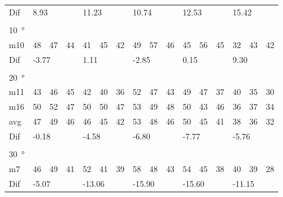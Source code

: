 \begin{table}[H]
\begin{tabular}{l|l|l|l|l|l|l|l|l|l|l|l|l|lll}
Dif & \multicolumn{3}{l|}{8.93} & \multicolumn{3}{l|}{11.23} & \multicolumn{3}{l|}{10.74} & \multicolumn{3}{l|}{12.53} & \multicolumn{3}{l}{15.42} \\ 
 \multicolumn{16}{l}{ } \\                             
\SI{10}{\degree}   & \multicolumn{3}{l|}{} & \multicolumn{3}{l|}{} & \multicolumn{3}{l|}{} & \multicolumn{3}{l|}{} & \multicolumn{3}{l}{}   \\  \hline
m10   &  48    &  47    &  44    & 41     &  45    &  42    & 49     &  57     &  46    &  45     &  56    &  45    & \multicolumn{1}{l|}{32} & \multicolumn{1}{l|}{43} & 42 \\ \hline
Dif & \multicolumn{3}{l|}{-3.77} & \multicolumn{3}{l|}{1.11} & \multicolumn{3}{l|}{-2.85} & \multicolumn{3}{l|}{0.15} & \multicolumn{3}{l}{9.30}  \\ 
 \multicolumn{16}{l}{ } \\                             
\SI{20}{\degree}   & \multicolumn{3}{l|}{} & \multicolumn{3}{l|}{} & \multicolumn{3}{l|}{} & \multicolumn{3}{l|}{} & \multicolumn{3}{l}{}   \\  \hline
m11    & 43     &  46    &  45    &  42    & 40     &  36    &  52    &  47     &  43    &   49    &  47    &   37   & \multicolumn{1}{l|}{40} & \multicolumn{1}{l|}{35} & 30 \\
m16    & 50     & 52     &  47    &  50    & 50     & 47     &   53   &  49     &  48    &  50     &  43    &  46    & \multicolumn{1}{l|}{36} & \multicolumn{1}{l|}{37} & 34 \\ \hline
avg &  47    &  49    &  46    &   46   &  45    &  42    &  53    &   48    &  46    &   50    &  45    &  41    & \multicolumn{1}{l|}{38} & \multicolumn{1}{l|}{36}  &32  \\ \hline  
Dif & \multicolumn{3}{l|}{-0.18} & \multicolumn{3}{l|}{-4.58} & \multicolumn{3}{l|}{-6.80} & \multicolumn{3}{l|}{-7.77} & \multicolumn{3}{l}{-5.76} \\ 
 \multicolumn{16}{l}{ } \\                             
\SI{30}{\degree}   & \multicolumn{3}{l|}{} & \multicolumn{3}{l|}{} & \multicolumn{3}{l|}{} & \multicolumn{3}{l|}{} & \multicolumn{3}{l}{}   \\  \hline
m7    & 46     & 49     & 41     &  52    & 41     &  39    & 58     & 48      &  43    &   54    & 45     &   38   & \multicolumn{1}{l|}{40} & \multicolumn{1}{l|}{39} & 28 \\ \hline
Dif & \multicolumn{3}{l|}{-5.07} & \multicolumn{3}{l|}{-13.06} & \multicolumn{3}{l|}{-15.90} & \multicolumn{3}{l|}{-15.60} & \multicolumn{3}{l}{-11.15}                                
\end{tabular}
\end{table}



